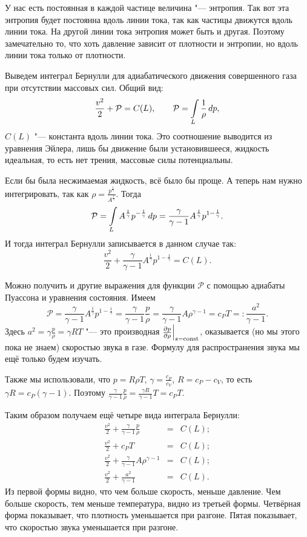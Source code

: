 У нас есть постоянная в каждой частице величина "--- энтропия. Так вот эта энтропия будет постоянна вдоль линии тока, так как частицы движутся вдоль линии тока. На другой линии тока энтропия может быть и другая. Поэтому замечательно то, что хоть давление зависит от плотности и энтропии, но вдоль линии тока только от плотности.

Выведем интеграл Бернулли для адиабатического движения совершенного газа при отсутствии массовых сил. Общий вид:
\begin{equation}
  \frac{v^2}2 + \mathcal P = C(L),\qquad \mathcal P =\int\limits_{L}\frac1\rho\,dp,
\end{equation}
$C(L)$ "--- константа вдоль линии тока. Это соотношение выводится из уравнения Эйлера, лишь бы движение были установившееся, жидкость идеальная, то есть нет трения, массовые силы потенциальны.

Если бы была несжимаемая жидкость, всё было бы проще. А теперь нам нужно интегрировать, так как $\rho = \frac{p^{\frac1\gamma}}{A^{\frac1\gamma}}$.
Тогда
\[ \mathcal P = \int\limits_{L} A^{\frac1\gamma}p^{-\frac1\gamma}\,dp = \frac{\gamma}{\gamma-1}A^{\frac1\gamma}p^{1-\frac1\gamma}.\]
И тогда интеграл Бернулли записывается в данном случае так:
\begin{equation}\label{AdiabaticBernulli1}
 \frac{v^2}2 + \frac{\gamma}{\gamma-1}A^{\frac1\gamma}p^{1-\frac1\gamma} = C(L).\end{equation}

Можно получить и другие выражения для функции $\mathcal P$ с помощью адиабаты Пуассона и уравнения состояния. Имеем
\[ \mathcal P = \frac{\gamma}{\gamma-1}A^{\frac1\gamma}p^{1-\frac1\gamma} = \frac{\gamma}{\gamma-1}\frac p\rho = \frac{\gamma}{\gamma-1} A \rho^{\gamma-1} = c_PT = :\frac{a^2}{\gamma-1}.\]
Здесь $a^2 = \gamma\frac p\rho = \gamma R T$ "--- это производная $\frac{\partial p}{\partial \rho}\Big|_{s=\operatorname{const}}$, оказывается (но мы этого пока не знаем) скоростью звука в газе. Формулу для распространения звука мы ещё только будем изучать.

Также мы использовали, что
$p = R\rho T$, $\gamma = \frac{c_P}{c_V}$, $R = c_P-c_V$, то есть $\gamma R = c_P(\gamma-1)$. Поэтому $\frac{\gamma}{\gamma-1}\frac p\rho = \frac{\gamma R}{\gamma-1}T = c_P T$.

Таким образом получаем ещё четыре вида интеграла Бернулли:
\begin{eqnarray}
  \label{AdiabaticBernulli2}
  \frac{v^2}2+\frac{\gamma}{\gamma-1}\frac p\rho &=& C(L);\\
  \label{AdiabaticBernulli3}
  \frac{v^2}2+c_PT &=& C(L);\\
  \label{AdiabaticBernulli4}
  \frac{v^2}2+ \frac{\gamma}{\gamma-1}A\rho^{\gamma-1} &=& C(L);\\
  \label{AdiabaticBernulli5}
  \frac{v^2}2+\frac{a^2}{\gamma-1} &=& C(L).
\end{eqnarray}
Из первой формы видно, что чем больше скорость, меньше давление.
Чем больше скорость, тем меньше температура, видно из третьей формы.
Четвёрная форма показывает, что плотность уменьшается при разгоне.
Пятая показывает, что скоростью звука уменьшается при разгоне.


